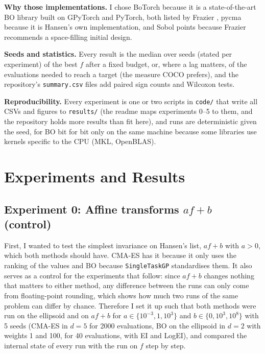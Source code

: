 \documentclass[12pt,a4paper]{article}
\begin{document}
\textbf{Why those implementations.} I chose BoTorch because it is a state-of-the-art BO library built on GPyTorch and PyTorch, both listed by Frazier \cite{frazier2018}, pycma because it is Hansen's own implementation, and Sobol points because Frazier recommends a space-filling initial design.

\textbf{Seeds and statistics.} Every result is the median over seeds (stated per experiment) of the best \(f\) after a fixed budget, or, where a lag matters, of the evaluations needed to reach a target (the measure COCO \cite{hansen2021coco} prefers), and the repository's \texttt{summary.csv} files add paired sign counts and Wilcoxon tests.

\textbf{Reproducibility.} Every experiment is one or two scripts in \texttt{code/} that write all CSVs and figures to \texttt{results/} (the readme maps experiments 0--5 to them, and the repository holds more results than fit here), and runs are deterministic given the seed, for BO bit for bit only on the same machine because some libraries use kernels specific to the CPU (MKL, OpenBLAS).

\section{Experiments and Results}

\subsection{\texorpdfstring{Experiment 0: Affine transforms \(af + b\) (control)}{Experiment 0: Affine transforms af + b (control)}}

First, I wanted to test the simplest invariance on Hansen's list, \(af + b\) with \(a > 0\), which both methods should have. CMA-ES has it because it only uses the ranking of the values and BO because \texttt{SingleTaskGP} standardises them. It also serves as a control for the experiments that follow: since \(af + b\) changes nothing that matters to either method, any difference between the runs can only come from floating-point rounding, which shows how much two runs of the same problem can differ by chance. Therefore I set it up such that both methods were run on the ellipsoid and on \(af + b\) for \(a \in \{ 10^{- 3},\allowbreak 1,\allowbreak 10^{3} \}\) and \(b \in \{ 0,\allowbreak 10^{3},\allowbreak 10^{8} \}\) with 5 seeds (CMA-ES in \(d = 5\) for 2000 evaluations, BO on the ellipsoid in \(d = 2\) with weights 1 and 100, for 40 evaluations, with EI and LogEI), and compared the internal state of every run with the run on \(f\) step by step.
\end{document}
